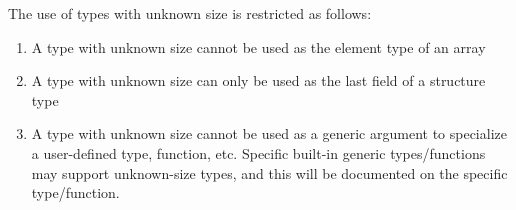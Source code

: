 The use of types with unknown size is restricted as follows:
\begin{enumerate}
  \item{A type with unknown size cannot be used as the element type of an array}
  \item{A type with unknown size can only be used as the last field of a structure type}
  \item{A type with unknown size cannot be used as a generic argument to specialize a user-defined type, function, etc. Specific built-in generic types/functions may support unknown-size types, and this will be documented on the specific type/function.}
\end{enumerate}